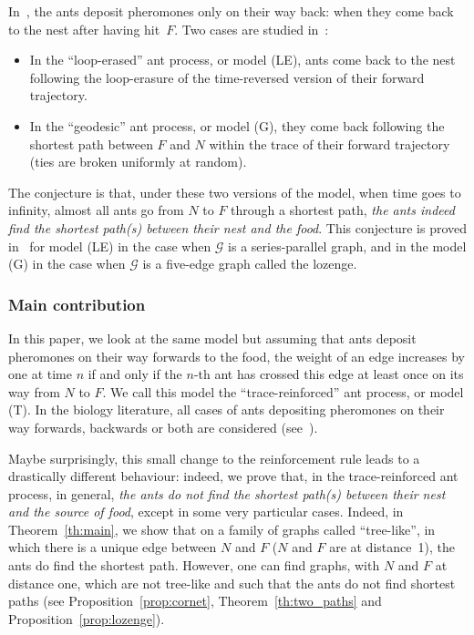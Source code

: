 \documentclass[10pt]{amsart}
\let\mathcal\mathscr
\numberwithin{equation}{section}
\theoremstyle{definition}
\begin{document}
In~\cite{KMS}, the ants deposit pheromones only on their way back:
\ie when they come back to the nest after having hit~$F$.
Two cases are studied in~\cite{KMS}:
\begin{itemize}
\item In the ``loop-erased'' ant process, or model (LE), ants come back to the nest following the loop-erasure of the time-reversed version of their forward trajectory.
\item In the ``geodesic'' ant process, or model (G), they come back following the shortest path between $F$ and $N$ within the trace of their forward trajectory (ties are broken uniformly at random).
\end{itemize}
The conjecture is that, under these two versions of the model, when time goes to infinity, almost all ants go from $N$ to $F$ through a shortest path, \ie \emph{the ants indeed find the shortest path(s) between their nest and the food}.
This conjecture is proved in~\cite{KMS} for model (LE) in the case when $\mathcal G$ is a series-parallel graph, and in the model (G) in the case when $\mathcal G$ is a five-edge graph called the lozenge.

\subsubsection*{Main contribution} In this paper, we look at the same model
but assuming that ants deposit pheromones on their way forwards to the food,
\ie the weight of an edge increases by one at time $n$ if and only
if the $n$-th ant has crossed this edge at least once on its way from $N$ to $F$.
We call this model the ``trace-reinforced'' ant process, or model (T).
In the biology literature, all cases of ants depositing pheromones on their way forward{s},
backwards or both are considered (see~\cite[Ch.\,1]{book_ant}).

Maybe surprisingly, this small change to the reinforcement rule leads to a drastically different behaviour:
indeed, we prove that, in the trace-reinforced ant process, in general,
\emph{the ants do not find the shortest path(s) between their nest and the source of food},
except in some very particular cases. Indeed,
in Theorem~\ref{th:main}, we show that on a family of graphs called ``tree-like'', in which there is a unique edge between $N$ and $F$ ($N$ and $F$ are at distance~1), the ants do find the shortest path. However, {one can find graphs, with $N$ and $F$ at distance one, which are not tree-like and such that the ants do not find shortest paths} (see Proposition~\ref{prop:cornet}, Theorem~\ref{th:two_paths} and Proposition~\ref{prop:lozenge}).
\end{document}
